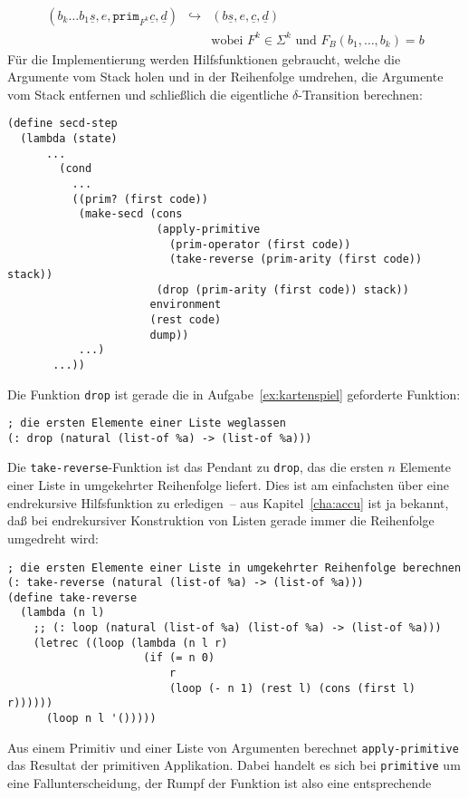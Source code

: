 %
\begin{eqnarray*}
  (b_k\ldots b_1 \underline{s}, e, \mathtt{prim}_{F^k}\underline{c}, \underline{d})
  &\hookrightarrow&
  (b\underline{s}, e, \underline{c}, \underline{d})
  \\ && \textrm{wobei $F^k\in\Sigma^k$ und $F_B(b_1,\ldots,b_k) = b$}
\end{eqnarray*}
%
Für die Implementierung werden Hilfsfunktionen gebraucht, welche die
Argumente vom Stack holen und in der Reihenfolge umdrehen, die
Argumente vom Stack entfernen und schließlich die eigentliche
$\delta$-Transition berechnen:
%
\begin{verbatim}
(define secd-step
  (lambda (state)
      ...
        (cond
          ...
          ((prim? (first code))
           (make-secd (cons
                       (apply-primitive
                         (prim-operator (first code))
                         (take-reverse (prim-arity (first code)) stack))
                       (drop (prim-arity (first code)) stack))
                      environment
                      (rest code)
                      dump))
           ...)
       ...))
\end{verbatim}
%
Die Funktion \texttt{drop} ist gerade die in
Aufgabe~\ref{ex:kartenspiel} geforderte Funktion:
%
\begin{verbatim}
; die ersten Elemente einer Liste weglassen
(: drop (natural (list-of %a) -> (list-of %a)))
\end{verbatim}
%
Die \texttt{take-reverse}-Funktion ist das Pendant zu \texttt{drop},
das die ersten $n$ Elemente einer Liste in umgekehrter Reihenfolge
liefert.  Dies ist am einfachsten über eine endrekursive Hilfsfunktion
zu erledigen~-- aus Kapitel~\ref{cha:accu} ist ja bekannt, daß bei
endrekursiver Konstruktion von Listen gerade immer die Reihenfolge
umgedreht wird:
%
\begin{verbatim}
; die ersten Elemente einer Liste in umgekehrter Reihenfolge berechnen
(: take-reverse (natural (list-of %a) -> (list-of %a)))
(define take-reverse
  (lambda (n l)
    ;; (: loop (natural (list-of %a) (list-of %a) -> (list-of %a)))
    (letrec ((loop (lambda (n l r)
                     (if (= n 0)
                         r
                         (loop (- n 1) (rest l) (cons (first l) r))))))
      (loop n l '()))))
\end{verbatim}
%
Aus einem Primitiv und einer Liste von Argumenten berechnet
\texttt{apply-primitive} das Resultat der primitiven Applikation.
Dabei handelt es sich bei \texttt{primitive} um eine
Fallunterscheidung, der Rumpf der Funktion ist also eine entsprechende
